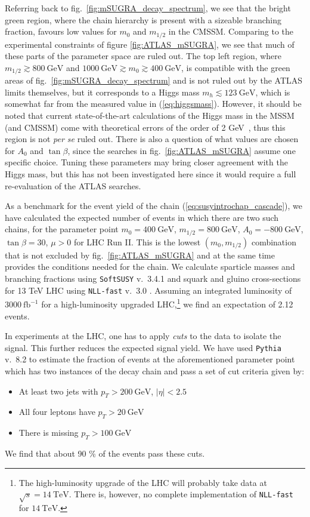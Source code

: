 \documentclass[twoside,english]{uiofysmaster}
\begin{document}
Referring back to fig.\ \ref{fig:mSUGRA_decay_spectrum}, we see that the bright green region, where the chain hierarchy is present with a sizeable branching fraction, favours low values for $m_0$ and $m_{1/2}$ in the CMSSM. Comparing to the experimental constraints of figure \ref{fig:ATLAS_mSUGRA}, we see that much of these parts of the parameter space are ruled out. The top left region, where $m_{1/2} \gtrsim 800~\mathrm{GeV}$ and $1000 ~\mathrm{GeV} \gtrsim m_0 \gtrsim 400 ~\mathrm{GeV}$, is compatible with the green areas of fig.\ \ref{fig:mSUGRA_decay_spectrum} and is not ruled out by the ATLAS limits themselves, but it corresponds to a Higgs mass $m_h \lesssim 123 ~\mathrm{GeV}$, which is somewhat far from the measured value in (\ref{eq:higgsmass}). However, it should be noted that current state-of-the-art calculations of the Higgs mass in the MSSM (and CMSSM) come with theoretical errors of the order of 2 GeV~\cite{Heinemeyer:2015dsa}, thus this region is not {\it per se} ruled out. There is also a question of what values are chosen for $A_0$ and $\tan\beta$, since the searches in fig.\ \ref{fig:ATLAS_mSUGRA} assume one specific choice. Tuning these parameters may bring closer agreement with the Higgs mass, but this has not been investigated here since it would require a full re-evaluation of the ATLAS searches.

As a benchmark for the event yield of the chain (\ref{eq:susyintrochap_cascade}), we have calculated the expected number of events in which there are two such chains, for the parameter point $m_0 = 400 ~\mathrm{GeV}$, $m_{1/2} = 800 ~\mathrm{GeV}$, $A_0 = -800~\mathrm{GeV}$, $\tan\beta = 30$, $\mu>0$ for LHC Run II. This is the lowest $(m_0,m_{1/2})$ combination that is not excluded by fig.\ \ref{fig:ATLAS_mSUGRA} and at the same time provides the conditions needed for the chain. We calculate sparticle masses and branching fractions using {\tt SoftSUSY} v.\ 3.4.1 \cite{Allanach:2001kg} and squark and gluino cross-sections for 13 TeV LHC using {\tt NLL-fast} v.\ 3.0 \cite{Beenakker:1996ch,Kulesza:2008jb,Kulesza:2009kq,Beenakker:2009ha,Beenakker:2011fu,Beenakker:1997ut,Beenakker:2010nq}. Assuming an integrated luminosity of $3000~\mathrm{fb}^{-1}$ for a high-luminosity upgraded LHC,\footnote{The high-luminosity upgrade of the LHC will probably take data at $\sqrt{s}=14~\mathrm{TeV}$. There is, however, no complete implementation of {\tt NLL-fast} for $14 ~\mathrm{TeV}$.} we find an expectation of 2.12 events.

In experiments at the LHC, one has to apply {\it cuts} to the data to isolate the signal. This further reduces the expected signal yield. We have used {\tt Pythia} v.\ 8.2 \cite{Sjostrand:2014zea} to estimate the fraction of events at the aforementioned parameter point which has two instances of the decay chain and pass a set of cut criteria given by: 
\begin{itemize}
	\item At least two jets with $p_T > 200~\mathrm{GeV}$, $|\eta|<2.5$
	\item All four leptons have $p_T > 20~\mathrm{GeV}$
	\item There is missing $p_T > 100~\mathrm{GeV}$
\end{itemize}
We find that about 90 \% of the events pass these cuts.
\end{document}
